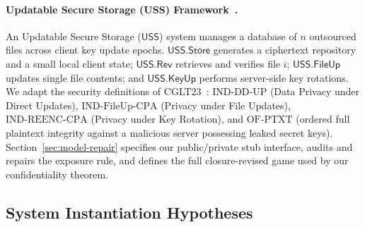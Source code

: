 \paragraph{Updatable Secure Storage (USS) Framework~\cite{CGLT23}.}
An Updatable Secure Storage ($\mathsf{USS}$) system manages a database of $n$ outsourced files across client key update epochs. 
$\mathsf{USS.Store}$ generates a ciphertext repository and a small local client state; $\mathsf{USS.Rev}$ retrieves and verifies file $i$; $\mathsf{USS.FileUp}$ updates single file contents; and $\mathsf{USS.KeyUp}$ performs server-side key rotations.
We adapt the security definitions of CGLT23~\cite{CGLT23}: $\mathrm{IND\text{-}DD\text{-}UP}$ (Data Privacy under Direct Updates), $\mathrm{IND\text{-}FileUp\text{-}CPA}$ (Privacy under File Updates), $\mathrm{IND\text{-}REENC\text{-}CPA}$ (Privacy under Key Rotation), and $\mathrm{OF\text{-}PTXT}$ (ordered full plaintext integrity against a malicious server possessing leaked secret keys). Section~\ref{sec:model-repair} specifies our public/private stub interface, audits and repairs the exposure rule, and defines the full closure-revised game used by our confidentiality theorem.

\subsection{System Instantiation Hypotheses}
\label{sec:hyp}

